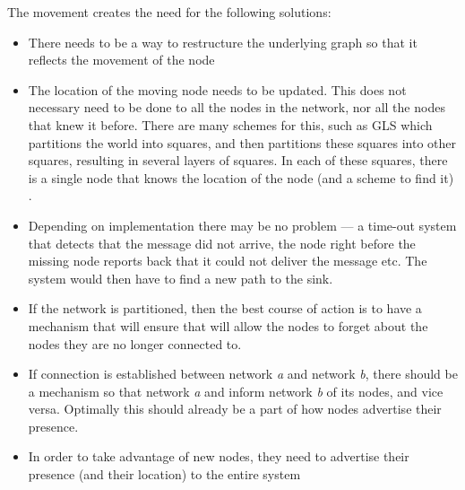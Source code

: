 The movement creates the need for the following solutions:
\begin{itemize}
\item There needs to be a way to restructure the underlying graph so that it reflects the movement of the node \cite{practical}
\item The location of the moving node needs to be updated. This does not necessary need to be done to all the nodes in the network, nor all the nodes that knew it before. There are many schemes for this, such as GLS \cite{scaleLocation} which partitions the world into squares, and then partitions these squares into other squares, resulting in several layers of squares. In each of these squares, there is a single node that knows the location of the node (and a scheme to find it) .
\item Depending on implementation there may be no problem --- a time-out system that detects that the message did not arrive, the node right before the missing node reports back that it could not deliver the message etc. The system would then have to find a new path to the sink.
\item If the network is partitioned, then the best course of action is to have a mechanism that will ensure that will allow the nodes to forget about the nodes they are no longer connected to. 
\item If connection is established between network \emph{a} and network \emph{b}, there should be a mechanism so that network \emph{a} and inform network \emph{b} of its nodes, and vice versa. Optimally this should already be a part of how nodes advertise their presence.
\item In order to take advantage of new nodes, they need to advertise their presence (and their location) to the entire system 
\end{itemize}
